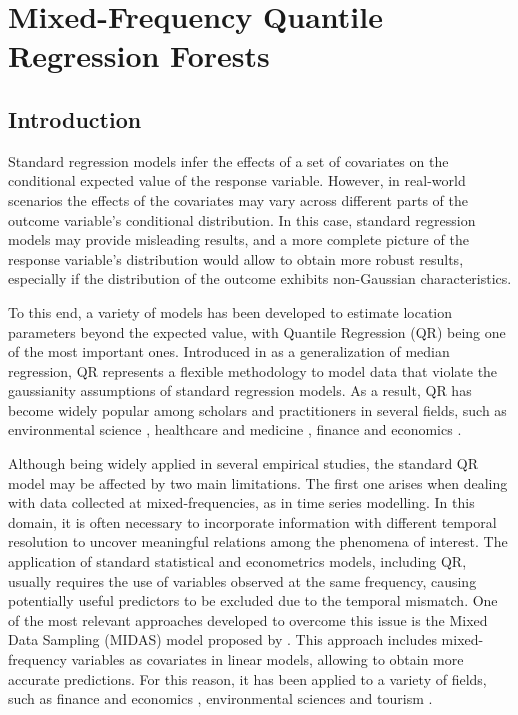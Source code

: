 \chapter{Mixed-Frequency Quantile Regression Forests} \label{ch:MIDAS-QRF}
\section{Introduction}

Standard regression models infer the effects of a set of covariates on the conditional expected value of the response variable. However, in real-world scenarios the effects of the covariates may vary across different parts of the outcome variable's conditional distribution. In this case, standard regression models may provide misleading results, and a more complete picture of the response variable's distribution would allow to obtain more robust results, especially if the distribution of the outcome exhibits non-Gaussian characteristics.

\vspace{0.15in}

\noindent To this end, a variety of models has been developed to estimate location parameters beyond the expected value, with Quantile Regression (QR) being one of the most important ones. Introduced in \cite{koenker1978regression} as a generalization of median regression, QR represents a flexible methodology to model data that violate the gaussianity assumptions of standard regression models. As a result, QR has become widely popular among scholars and practitioners in several fields, such as environmental science \citep{reich2012spatiotemporal, vasseur2021comparing, coronese2019evidence}, healthcare and medicine \citep{wei2006quantile,
merlo2022two, borgoni2018modelling}, finance and economics \citep{taylor1999quantile, merlo2022quantile, bernardi2018bayesian, petrella2019joint, daouia2018estimation, daouia2021expecthill}. 
\vspace{0.15in}

\noindent Although being widely applied in several empirical studies, the standard QR model may be affected by two main limitations. 
The first one arises when dealing with data collected at mixed-frequencies, as in time series modelling. In this domain, it is often necessary to incorporate information with different temporal resolution to uncover meaningful relations among the phenomena of interest. The application of standard statistical and econometrics models, including QR, usually requires the use of variables observed at the same frequency, causing potentially useful predictors to be excluded due to the temporal mismatch. 
One of the most relevant approaches developed to overcome this issue is the Mixed Data Sampling (MIDAS) model proposed by \cite{ghysels2007midas}. This approach includes mixed-frequency variables as covariates in linear models, allowing to obtain more accurate predictions. For this reason, it has been applied to a variety of fields, such as finance and economics \citep{kuzin2009midas, andreani2021multivariate, candila2023mixed}, environmental sciences \citep{oloko2022climate, jiang2023carbon} and tourism \citep{bangwayo2015can, wen2021forecasting}.
\vspace{0.15in}

